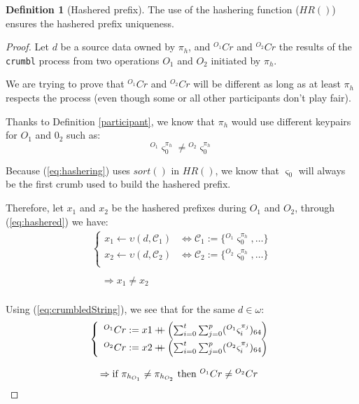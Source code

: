 \documentclass[twoside,twocolumn]{article}
\newcommand{\concat}{\mathbin{{+}\mspace{-8mu}{+}}}
\theoremstyle{definition}
\newtheorem{definition}{Definition}
\theoremstyle{remark}
\begin{document}
\begin{definition}[Hashered prefix]
    The use of the hashering function ($HR()$) ensures the hashered prefix uniqueness.

    \begin{proof}
        Let $d$ be a source data owned by $\pi_{h}$, and ${}^{O_1}Cr$ and ${}^{O_2}Cr$ the results of the \texttt{crumbl} process from two operations 
        $O_1$ and $O_2$ initiated by $\pi_h$.

        We are trying to prove that ${}^{O_1}Cr$ and ${}^{O_2}Cr$ will be different as long as at least $\pi_{h}$ respects the process (even though 
        some or all other participants don't play fair).

        Thanks to Definition \ref{participant}, we know that $\pi_h$ would use different keypairs for $O_1$ and $0_2$ such as:$$
            {}^{O_1}\varsigma_0^{\pi_h} \neq {}^{O_2}\varsigma_0^{\pi_h}
        $$

        Because (\ref{eq:hashering}) uses $sort()$ in $HR()$, we know that $\varsigma_0$ will always be the first crumb used to build the hashered 
        prefix.
        
        Therefore, let $x_1$ and $x_2$ be the hashered prefixes during $O_1$ and $O_2$, through (\ref{eq:hashered}) we have:$$
        \begin{array}{l}
            \left\{
                \begin{array}{ll}
                    x_1 \gets \upsilon(d, \mathcal{C}_1) &\iff \mathcal{C}_1 := \{ {}^{O_1}\varsigma_0^{\pi_h}, \dots \} \\
                    x_2 \gets \upsilon(d, \mathcal{C}_2) &\iff \mathcal{C}_2 := \{ {}^{O_2}\varsigma_0^{\pi_h}, \dots \} \\
                \end{array}
            \right. \\ \\
            \quad \Rightarrow x_1 \neq x_2 \\
            \end{array}
        $$
        
        Using (\ref{eq:crumbledString}), we see that for the same $d \in \omega$:$$
        \begin{array}{l}
            \left\{
                \begin{array}{l}
                    {}^{O_1}Cr := x1 \concat \left( \sum_{i=0}^t \sum_{j=0}^p ({}^{O_1}\varsigma_i^{\pi_j})_{64} \right) \\
                    {}^{O_2}Cr := x2 \concat \left( \sum_{i=0}^t \sum_{j=0}^p ({}^{O_2}\varsigma_i^{\pi_j})_{64} \right) \\
                \end{array}
            \right. \\ \\
            \quad \Rightarrow \textrm{if } \pi_{h_{O_1}} \neq \pi_{h_{O_2}} \textrm{ then } {}^{O_1}Cr \neq {}^{O_2}Cr \\
        \end{array}$$


\end{proof}
\end{definition}
\end{document}
